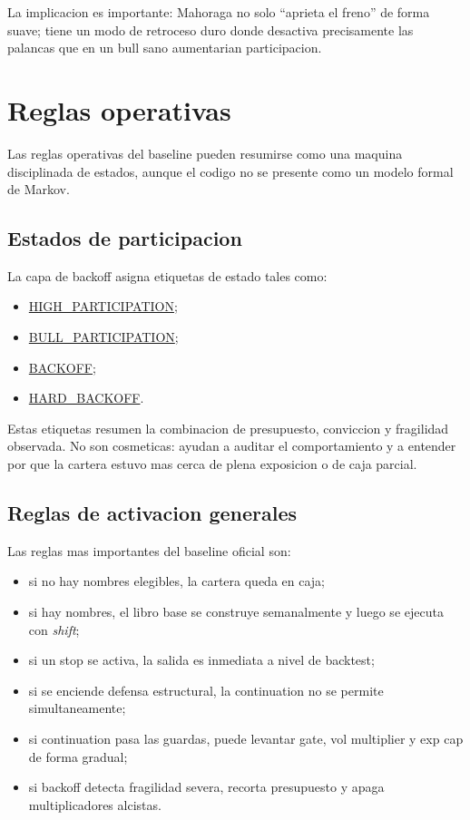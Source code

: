 \documentclass[11pt,letterpaper]{article}
\newcommand{\code}[1]{{\urlstyle{tt}\url{#1}}}
\begin{document}
La implicacion es importante: Mahoraga no solo \enquote{aprieta el freno} de forma suave; tiene un modo de retroceso duro donde desactiva precisamente las palancas que en un bull sano aumentarian participacion.

\section{Reglas operativas}
Las reglas operativas del baseline pueden resumirse como una maquina disciplinada de estados, aunque el codigo no se presente como un modelo formal de Markov.

\subsection{Estados de participacion}
La capa de backoff asigna etiquetas de estado tales como:
\begin{itemize}
    \item \code{HIGH\_PARTICIPATION};
    \item \code{BULL\_PARTICIPATION};
    \item \code{BACKOFF};
    \item \code{HARD\_BACKOFF}.
\end{itemize}

Estas etiquetas resumen la combinacion de presupuesto, conviccion y fragilidad observada. No son cosmeticas: ayudan a auditar el comportamiento y a entender por que la cartera estuvo mas cerca de plena exposicion o de caja parcial.

\subsection{Reglas de activacion generales}
Las reglas mas importantes del baseline oficial son:
\begin{itemize}
    \item si no hay nombres elegibles, la cartera queda en caja;
    \item si hay nombres, el libro base se construye semanalmente y luego se ejecuta con \emph{shift};
    \item si un stop se activa, la salida es inmediata a nivel de backtest;
    \item si se enciende defensa estructural, la continuation no se permite simultaneamente;
    \item si continuation pasa las guardas, puede levantar gate, vol multiplier y exp cap de forma gradual;
    \item si backoff detecta fragilidad severa, recorta presupuesto y apaga multiplicadores alcistas.
\end{itemize}
\end{document}
